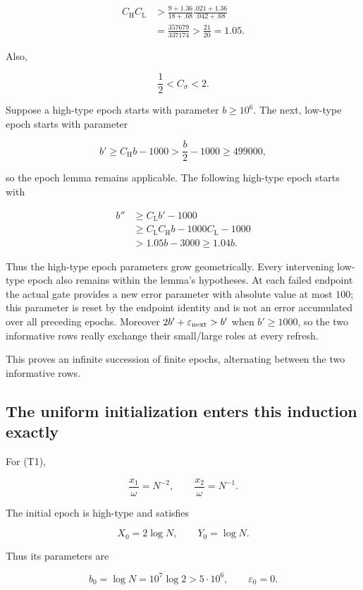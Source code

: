 \[
\begin{aligned}
C_{\mathrm H}C_{\mathrm L}
&>
\frac{9+1.36}{18+.68}
\frac{.021+1.36}{.042+.68}\\
&=\frac{357679}{337174}
>\frac{21}{20}=1.05.
\end{aligned}
\tag{T47}
\]

Also,

\[
\frac12<C_\sigma<2.
\tag{T48}
\]

Suppose a high-type epoch starts with parameter \(b\ge10^6\). The next, low-type epoch starts with parameter

\[
b'\ge C_{\mathrm H}b-1000
>\frac b2-1000\ge499000,
\tag{T49}
\]

so the epoch lemma remains applicable. The following high-type epoch starts with

\[
\begin{aligned}
b''
&\ge C_{\mathrm L}b'-1000\\
&\ge C_{\mathrm L}C_{\mathrm H}b
-1000C_{\mathrm L}-1000\\
&>1.05b-3000
\ge1.04b.
\end{aligned}
\tag{T50}
\]

Thus the high-type epoch parameters grow geometrically. Every intervening low-type epoch also remains within the lemma’s hypotheses. At each failed endpoint the actual gate provides a new error parameter with absolute value at most $100$; this parameter is reset by the endpoint identity and is not an error accumulated over all preceding epochs. Moreover $2b'+\varepsilon_{\rm next}>b'$ when $b'\ge1000$, so the two informative rows really exchange their small/large roles at every refresh.

This proves an infinite succession of finite epochs, alternating between the two informative rows.



\subsection{The uniform initialization enters this induction exactly}

For (T1),

\[
\frac{x_1}{\omega}=N^{-2},
\qquad
\frac{x_2}{\omega}=N^{-1}.
\]

The initial epoch is high-type and satisfies

\[
X_0=2\log N,\qquad Y_0=\log N.
\]

Thus its parameters are

\[
b_0=\log N=10^7\log2>5\cdot10^6,
\qquad \varepsilon_0=0.
\tag{T51}
\]

